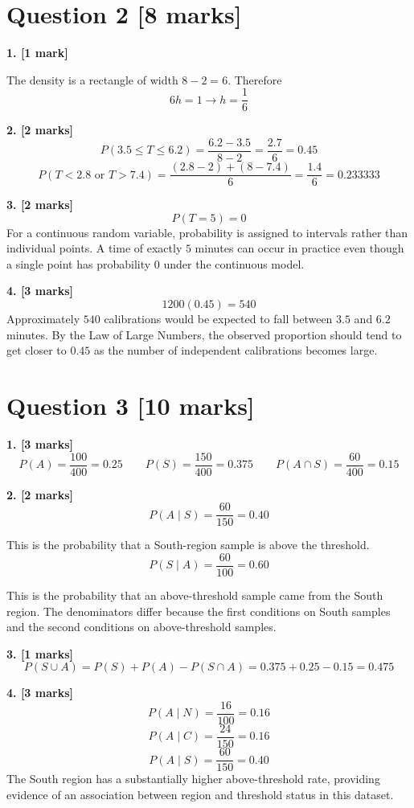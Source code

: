 \documentclass[10pt,letterpaper]{article}
\begin{document}
\section*{Question 2 \hfill [8 marks]}

\textbf{1. [1 mark]}

The density is a rectangle of width \(8-2=6\). Therefore
$$6h=1 \rightarrow \boxed{h=\frac16}$$


\textbf{2. [2 marks]}
$$P(3.5\le T\le6.2)=\frac{6.2-3.5}{8-2}=\frac{2.7}{6}=\boxed{0.45}$$
$$P(T<2.8\text{ or }T>7.4)=\frac{(2.8-2)+(8-7.4)}{6}=\frac{1.4}{6}=\boxed{0.233333}$$

\textbf{3. [2 marks]}
$$\boxed{P(T=5)=0}$$
For a continuous random variable, probability is assigned to intervals rather than individual points. A time of exactly \(5\) minutes can occur in practice even though a single point has probability \(0\) under the continuous model.

\textbf{4. [3 marks]}
$$1200(0.45)=\boxed{540}$$
Approximately \(540\) calibrations would be expected to fall between \(3.5\) and \(6.2\) minutes. By the Law of Large Numbers, the observed proportion should tend to get closer to \(0.45\) as the number of independent calibrations becomes large.

\section*{Question 3 \hfill [10 marks]}

\textbf{1. [3 marks]}
$$P(A)=\frac{100}{400}=\boxed{0.25} \qquad P(S)=\frac{150}{400}=\boxed{0.375} \qquad P(A\cap S)=\frac{60}{400}=\boxed{0.15}$$

\textbf{2. [2 marks]}
$$P(A\mid S)=\frac{60}{150}=\boxed{0.40}$$

This is the probability that a South-region sample is above the threshold.
$$P(S\mid A)=\frac{60}{100}=\boxed{0.60}$$

This is the probability that an above-threshold sample came from the South region. The denominators differ because the first conditions on South samples and the second conditions on above-threshold samples.

\textbf{3. [1 marks]}
$$P(S\cup A)=P(S)+P(A)-P(S\cap A)=0.375+0.25-0.15=\boxed{0.475}$$

\textbf{4. [3 marks]}
$$P(A\mid N)=\frac{16}{100}=\boxed{0.16}$$
$$P(A\mid C)=\frac{24}{150}=\boxed{0.16}$$
$$P(A\mid S)=\frac{60}{150}=\boxed{0.40}$$
The South region has a substantially higher above-threshold rate, providing evidence of an association between region and threshold status in this dataset.
\end{document}
